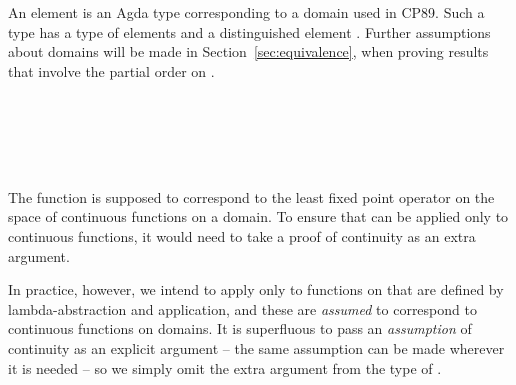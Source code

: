 \begin{AgdaAlign}
An element  is an Agda type corresponding to a domain used in CP89.
Such a type  has a type of elements 
and a distinguished element .
Further assumptions about domains
will be made in Section~\ref{sec:equivalence}, when proving results that
involve the partial order on .
%
\begin{code}%
\>[0]\AgdaSpace{}%
\<%
\\
\>[0][@{}l@{\AgdaIndent{0}}]%
\>[4]\AgdaSymbol{(}\AgdaSpace{}%
%
\>[14]\AgdaSymbol{:}%
\>[17]\AgdaSpace{}%
\AgdaSymbol{)}\<%
\\
%
\>[4]\AgdaSymbol{(}\AgdaSpace{}%
%
\>[14]\AgdaSymbol{:}%
\>[17]\AgdaSpace{}%
\AgdaSpace{}%
\AgdaSpace{}%
\AgdaSymbol{)}\<%
\\
%
\>[4]\AgdaSymbol{(}\AgdaSpace{}%
%
\>[14]\AgdaSymbol{:}%
\>[17]\AgdaSymbol{\{}\AgdaSpace{}%
\AgdaSymbol{:}\AgdaSpace{}%
\AgdaSymbol{\}}\AgdaSpace{}%
\AgdaSpace{}%
\AgdaSpace{}%
\AgdaSpace{}%
\AgdaSpace{}%
\AgdaSymbol{)}\<%
\\
%
\>[4]\AgdaSymbol{(}\AgdaSpace{}%
%
\>[14]\AgdaSymbol{:}%
\>[17]\AgdaSymbol{\{}\AgdaSpace{}%
\AgdaSymbol{:}\AgdaSpace{}%
\AgdaSymbol{\}}\AgdaSpace{}%
\AgdaSpace{}%
\AgdaSymbol{(}\AgdaSpace{}%
\AgdaSpace{}%
\AgdaSpace{}%
\AgdaSpace{}%
\AgdaSpace{}%
\AgdaSpace{}%
\AgdaSpace{}%
\AgdaSpace{}%
\AgdaSymbol{)}\AgdaSpace{}%
\AgdaSpace{}%
\AgdaSpace{}%
\AgdaSpace{}%
\AgdaSpace{}%
\AgdaSymbol{)}\<%
\end{code}
%
The function  is supposed to correspond to the least fixed point operator
on the space of continuous functions on a domain.
To ensure that  can be applied only to continuous functions,
it would need to take a proof of continuity as an extra argument.

In practice, however, we intend to apply  only to functions on 
that are defined by lambda-abstraction and application, 
and these are \emph{assumed} to correspond to continuous functions on domains.
It is superfluous to pass an \emph{assumption} of continuity as an explicit argument
– the same assumption can be made wherever it is needed
– so we simply omit the extra argument from the type of .


\end{AgdaAlign}
